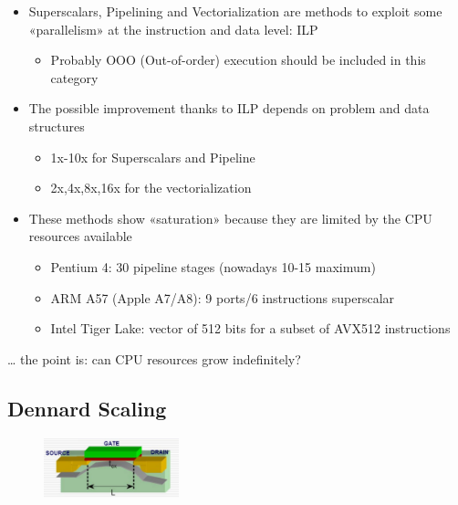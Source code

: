 \begin{tcolorbox}[width=\textwidth,colback={white},title={Summary: },colbacktitle=cyan,coltitle=black]
  \begin{itemize}
    \item Superscalars, Pipelining and Vectorialization are methods to exploit some «parallelism» at the instruction and data level: ILP
    \begin{itemize}
        \item Probably OOO (Out-of-order) execution should be included in this category
    \end{itemize}
    \item The possible improvement thanks to ILP depends on problem and data structures
    \begin{itemize}
        \item 1x-10x for Superscalars and Pipeline
        \item 2x,4x,8x,16x for the vectorialization
    \end{itemize}
    \item These methods show «saturation» because they are limited by the CPU resources available
        \begin{itemize}
        \item Pentium 4: 30 pipeline stages (nowadays 10-15 maximum)
        \item ARM A57 (Apple A7/A8): 9 ports/6 instructions superscalar
        \item Intel Tiger Lake: vector of 512 bits for a subset of AVX512 instructions
    \end{itemize}
   \end{itemize}  
   … the point is: can CPU resources grow indefinitely?
\end{tcolorbox}


\subsection{Dennard Scaling}

\begin{figure}
  \begin{center}
    \includegraphics[width=0.35\textwidth]{figure_parallel/fet.png}
  \end{center}
\end{figure}

